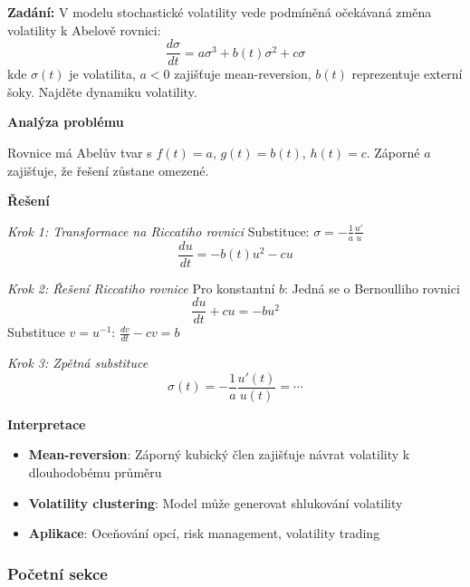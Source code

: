 \begin{example}
\label{ex:volatilita}

\noindent\textbf{Zadání:} V modelu stochastické volatility vede podmíněná očekávaná změna volatility k Abelově rovnici:
\[
\frac{d\sigma}{dt} = a\sigma^3 + b(t)\sigma^2 + c\sigma
\]
kde $\sigma(t)$ je volatilita, $a < 0$ zajišťuje mean-reversion, $b(t)$ reprezentuje externí šoky. Najděte dynamiku volatility.

\vspace{1.5\baselineskip}

\noindent\textbf{Analýza problému}

Rovnice má Abelův tvar s $f(t) = a$, $g(t) = b(t)$, $h(t) = c$. Záporné $a$ zajišťuje, že řešení zůstane omezené.

\vspace{1.5\baselineskip}

\noindent\textbf{Řešení}

\noindent\textit{Krok 1: Transformace na Riccatiho rovnici}
Substituce: $\sigma = -\frac{1}{a}\frac{u'}{u}$
\[
\frac{du}{dt} = -b(t)u^2 - c u
\]

\vspace{1\baselineskip}

\noindent\textit{Krok 2: Řešení Riccatiho rovnice}
Pro konstantní $b$: Jedná se o Bernoulliho rovnici
\[
\frac{du}{dt} + c u = -b u^2
\]
Substituce $v = u^{-1}$: $\frac{dv}{dt} - c v = b$

\vspace{1\baselineskip}

\noindent\textit{Krok 3: Zpětná substituce}
\[
\sigma(t) = -\frac{1}{a}\frac{u'(t)}{u(t)} = \cdots
\]

\vspace{1.5\baselineskip}

\noindent\textbf{Interpretace}
\begin{itemize}
\item \textbf{Mean-reversion}: Záporný kubický člen zajišťuje návrat volatility k dlouhodobému průměru
\item \textbf{Volatility clustering}: Model může generovat shlukování volatility
\item \textbf{Aplikace}: Oceňování opcí, risk management, volatility trading
\end{itemize}

\end{example}


\subsubsection{Početní sekce}
